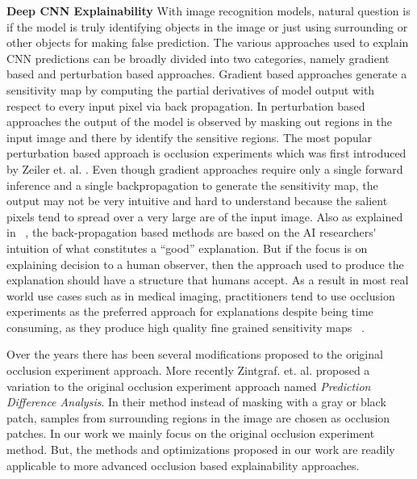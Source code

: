 \vspace{2mm}
\noindent \textbf{Deep CNN Explainability} With image recognition models, natural question is if the model is truly identifying objects in the image or just using surrounding or other objects for making false prediction.
The various approaches used to explain CNN predictions can be broadly divided into two categories, namely gradient based and perturbation based approaches. Gradient based approaches generate a sensitivity map by computing the partial derivatives of model output with respect to every input pixel via back propagation.
In perturbation based approaches the output of the model is observed by masking out regions in the input image and there by identify the sensitive regions. The most popular perturbation based approach is occlusion experiments which was first introduced by Zeiler et. al. \cite{zeiler2014visualizing}.
Even though gradient approaches require only a single forward inference and a single backpropagation to generate the sensitivity map, the output may not be very intuitive and hard to understand because the salient pixels tend to spread over a very large are of the input image.
Also as explained in ~\cite{miller2017explanation}, the back-propagation based methods are based on the AI researchers\'~ intuition of what constitutes a ``good'' explanation. But if the focus is on explaining decision to a human observer, then the approach used to produce the explanation should have a structure that humans accept.
As a result in most real world use cases such as in medical imaging, practitioners tend to use occlusion experiments as the preferred approach for explanations despite being time consuming, as they produce high quality fine grained sensitivity maps ~\cite{jung2017deep}.

Over the years there has been several modifications proposed to the original occlusion experiment approach. More recently Zintgraf. et. al. \cite{zintgraf2017visualizing} proposed a variation to the original occlusion experiment approach named \textit{Prediction Difference Analysis}. In their method instead of masking with a gray or black patch, samples from surrounding regions in the image are chosen as occlusion patches.
In our work we mainly focus on the original occlusion experiment method. But, the methods and optimizations proposed in our work are readily applicable to more advanced occlusion based explainability approaches.